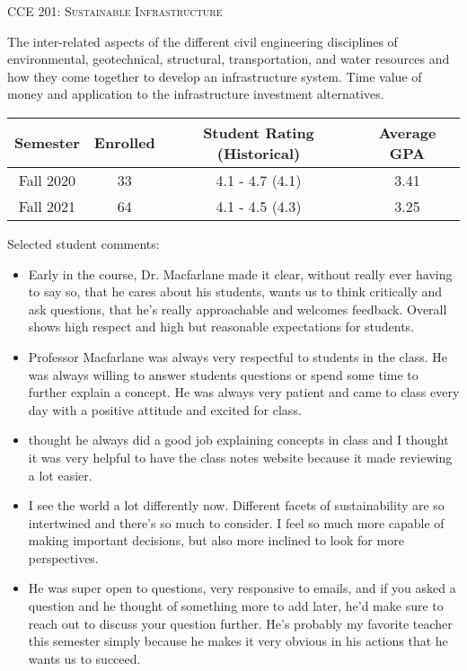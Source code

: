 \documentclass[margin,line]{res}
\newif\ifdetail
\newcommand{\acc}{\scshape }
\begin{document}
\begin{resume}
{\acc CCE 201: Sustainable Infrastructure}

\vspace{-.4cm}
The inter-related aspects of the different civil engineering disciplines of
environmental, geotechnical, structural, transportation, and water resources and
how they come together to develop an infrastructure system. Time value of money
and application to the infrastructure investment alternatives.


\ifdetail
\begin{tabular}{cccc}
  \toprule
  Semester & Enrolled & Student Rating (Historical) & Average GPA\\
  \midrule
  Fall 2020 & 33 & 4.1 - 4.7 (4.1)& 3.41 \\
  Fall 2021 & 64 & 4.1 - 4.5 (4.3)& 3.25 \\
  \bottomrule
\end{tabular}

Selected student comments:
\begin{itemize}
  \item Early in the course, Dr. Macfarlane made it clear, without really ever
    having to say so, that he cares about his students, wants us to think
    critically and ask questions, that he's really approachable and welcomes
    feedback. Overall shows high respect and high but reasonable expectations
    for students.
  \item Professor Macfarlane was always very respectful to students in the class. He
    was always willing to answer students questions or spend some time to
    further explain a concept. He was always very patient and came to class
    every day with a positive attitude and excited for class.
  \item thought he always did a good job explaining concepts in class and I thought it was very helpful to have the class notes website because it made reviewing a lot easier.
  \item I see the world a lot differently now. Different facets of sustainability are so intertwined and there's so much to consider. I feel so much more capable of making important decisions, but also more inclined to look for more perspectives.
  \item He was super open to questions, very responsive to emails, and if you asked a question and he thought of something more to add later, he'd make sure to reach out to discuss your question further. He's probably my favorite teacher this semester simply because he makes it very obvious in his actions that he wants us to succeed.
\end{itemize}



\end{resume}
\end{document}
